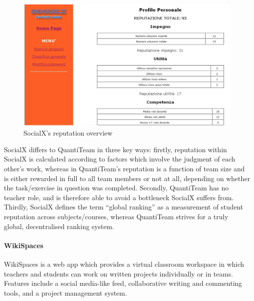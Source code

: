 \documentclass[12pt]{report}
\let\oldparagraph\paragraph
\renewcommand{\paragraph}[1]{\oldparagraph{#1}\mbox{}}
\begin{document}
\begin{figure}[htbp]
\centering
\includegraphics{../screenshots/socialx.png}
\caption{SocialX's reputation overview}
\end{figure}

SocialX differs to QuantiTeam in three key ways: firstly, reputation
within SocialX is calculated according to factors which involve the
judgment of each other's work, whereas in QuantiTeam's reputation is a
function of team size and is either rewarded in full to all team members
or not at all, depending on whether the task/exercise in question was
completed. Secondly, QuantiTeam has no teacher role, and is therefore
able to avoid a bottleneck SocialX suffers from. Thirdly, SocialX
defines the term ``global ranking'' as a measurement of student
reputation across subjects/courses, whereas QuantiTeam strives for a
truly global, decentralised ranking system.

\paragraph{WikiSpaces}\label{wikispaces}

WikiSpaces\cite{1wikispaces} is a web app which provides a virtual classroom workspace in
which teachers and students can work on written projects individually or
in teams. Features include a social media-like feed, collaborative
writing and commenting tools, and a project management system.
\end{document}
